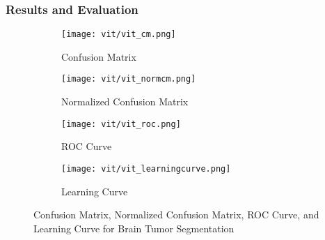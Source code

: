 \subsubsection{Results and Evaluation}

\begin{figure}[H]
  \centering
  \begin{subfigure}[b]{0.2\textwidth}
    \centering
    \texttt{[image: vit/vit\_cm.png]}
    \caption{Confusion Matrix}
    \label{fig:vit_cm}
  \end{subfigure}
  \hfill
  \begin{subfigure}[b]{0.2\textwidth}
    \centering
    \texttt{[image: vit/vit\_normcm.png]}
    \caption{Normalized Confusion Matrix}
    \label{fig:vit_normcm}
  \end{subfigure}
  \hfill
  \begin{subfigure}[b]{0.25\textwidth}
    \centering
    \texttt{[image: vit/vit\_roc.png]}
    \caption{ROC Curve}
    \label{fig:vit_roc}
  \end{subfigure}
  \hfill
  \begin{subfigure}[b]{0.25\textwidth}
    \centering
    \texttt{[image: vit/vit\_learningcurve.png]}
    \caption{Learning Curve}
    \label{fig:vit_learning_curve}
  \end{subfigure}
  \caption{Confusion Matrix, Normalized Confusion Matrix, ROC Curve, and Learning Curve for Brain Tumor Segmentation}
  \label{fig:vit_evaluation}
\end{figure}


